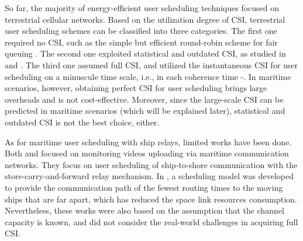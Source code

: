\documentclass[journal]{IEEEtran}
\begin{document}
   So far, the majority of energy-efficient user scheduling techniques focused on terrestrial cellular networks. 
   Based on the utilization degree of CSI, terrestrial user scheduling schemes can be classified into three categories. The first one required no CSI, such as the simple but efficient round-robin scheme for fair queuing \cite{p51}. The second one exploited statistical and outdated CSI, as studied in \cite{p52} and \cite{p53}. The third one assumed full CSI, and utilized the instantaneous CSI for user scheduling on a minuscule time scale, i.e., in each coherence time \cite{p4}-\cite{p7}. 
   In maritime scenarios, however, obtaining perfect CSI for user scheduling brings large overheads and is not cost-effective.
   Moreover, since the large-scale CSI can be predicted in maritime scenarios (which will be explained later), statistical and outdated CSI is not the best choice, either. 
  
   As for maritime user scheduling with ship relays, limited works have been done. %
   Both \cite{p300} and \cite{p301} focused on monitoring videos uploading via maritime communication networks. They focus on user scheduling of ship-to-shore communication with the store-carry-and-forward relay mechanism.  
   In \cite{p303}, a scheduling model was developed to provide the communication path of the fewest routing times to the moving ships that are far apart, which has reduced the space link resources consumption. 
   Nevertheless, these works were also based on the assumption that the channel capacity is known, and did not consider the real-world challenges in acquiring full CSI. 
    
   
   
   
   
\end{document}
